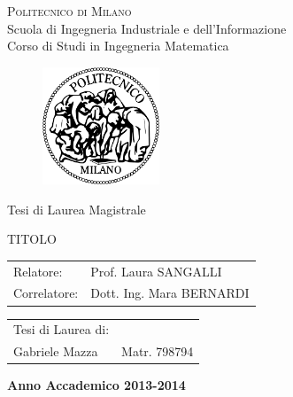 \documentclass[a4paper,11pt,twoside,openright]{book}							%
\date{28 Luglio 2014}
\author{Gabriele Mazza}
\title{}
\begin{document}
\thispagestyle{empty}
\enlargethispage{60mm}
\begin{center}
\Huge{\textsc{Politecnico di Milano}}\\
\vspace{5mm}
\large{Scuola di Ingegneria Industriale e dell'Informazione}\\
\vspace{5mm}
\large{Corso di Studi in Ingegneria Matematica}\\
\vspace{10mm}
\begin{figure}[h]
	\begin{center}
	\includegraphics[width=35mm]{Immagini/Logo.png}
	\end{center}
	\end{figure}
\vspace{5mm}
\large{Tesi di Laurea Magistrale}\\
\vspace{10mm}

\begin{LARGE}
TITOLO
\end{LARGE}
\vspace{30mm}

\begin{flushleft}
\begin{tabular}{l l }
Relatore:    & Prof. Laura SANGALLI \\
Correlatore: & Dott. Ing. Mara BERNARDI
\end{tabular}
\end{flushleft}
\vspace{12mm}
\begin{flushright}
\begin{tabular}{l l }
Tesi di Laurea di: & \\
Gabriele Mazza & Matr. 798794 \\
\end{tabular}
\end{flushright}
\vspace{12mm}
{\large{\bf Anno Accademico 2013-2014}}
\end{center}
\newpage
\thispagestyle{empty}
\end{document}
